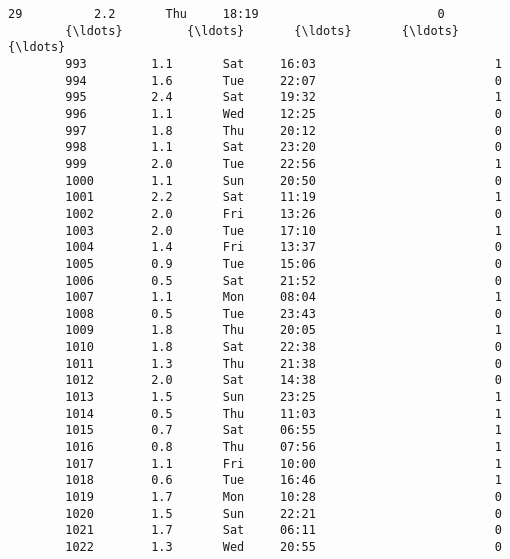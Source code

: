 \documentclass[11pt]{article}
\begin{document}
\begin{Verbatim}[commandchars=\\\{\}]
        29          2.2       Thu     18:19                         0   
        {\ldots}         {\ldots}       {\ldots}       {\ldots}                       {\ldots}   
        993         1.1       Sat     16:03                         1   
        994         1.6       Tue     22:07                         0   
        995         2.4       Sat     19:32                         1   
        996         1.1       Wed     12:25                         0   
        997         1.8       Thu     20:12                         0   
        998         1.1       Sat     23:20                         0   
        999         2.0       Tue     22:56                         1   
        1000        1.1       Sun     20:50                         0   
        1001        2.2       Sat     11:19                         1   
        1002        2.0       Fri     13:26                         0   
        1003        2.0       Tue     17:10                         1   
        1004        1.4       Fri     13:37                         0   
        1005        0.9       Tue     15:06                         0   
        1006        0.5       Sat     21:52                         0   
        1007        1.1       Mon     08:04                         1   
        1008        0.5       Tue     23:43                         0   
        1009        1.8       Thu     20:05                         1   
        1010        1.8       Sat     22:38                         0   
        1011        1.3       Thu     21:38                         0   
        1012        2.0       Sat     14:38                         0   
        1013        1.5       Sun     23:25                         1   
        1014        0.5       Thu     11:03                         1   
        1015        0.7       Sat     06:55                         1   
        1016        0.8       Thu     07:56                         1   
        1017        1.1       Fri     10:00                         1   
        1018        0.6       Tue     16:46                         1   
        1019        1.7       Mon     10:28                         0   
        1020        1.5       Sun     22:21                         0   
        1021        1.7       Sat     06:11                         0   
        1022        1.3       Wed     20:55                         0   
        

\end{Verbatim}
\end{document}
